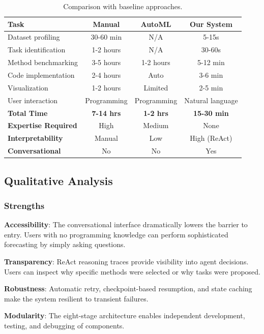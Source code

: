 \documentclass[11pt,a4paper]{article}
\begin{document}
\begin{table}[H]
\centering
\small
\begin{tabular}{lccc}
\toprule
\textbf{Task} & \textbf{Manual} & \textbf{AutoML} & \textbf{Our System} \\
\midrule
Dataset profiling & 30-60 min & N/A & 5-15s \\
Task identification & 1-2 hours & N/A & 30-60s \\
Method benchmarking & 3-5 hours & 1-2 hours & 5-12 min \\
Code implementation & 2-4 hours & Auto & 3-6 min \\
Visualization & 1-2 hours & Limited & 2-5 min \\
User interaction & Programming & Programming & Natural language \\
\midrule
\textbf{Total Time} & \textbf{7-14 hrs} & \textbf{1-2 hrs} & \textbf{15-30 min} \\
\textbf{Expertise Required} & High & Medium & None \\
\textbf{Interpretability} & Manual & Low & High (ReAct) \\
\textbf{Conversational} & No & No & Yes \\
\bottomrule
\end{tabular}
\caption{Comparison with baseline approaches.}
\end{table}

\subsection{Qualitative Analysis}

\subsubsection{Strengths}

\textbf{Accessibility}: The conversational interface dramatically lowers the barrier to entry. Users with no programming knowledge can perform sophisticated forecasting by simply asking questions.

\textbf{Transparency}: ReAct reasoning traces provide visibility into agent decisions. Users can inspect why specific methods were selected or why tasks were proposed.

\textbf{Robustness}: Automatic retry, checkpoint-based resumption, and state caching make the system resilient to transient failures.

\textbf{Modularity}: The eight-stage architecture enables independent development, testing, and debugging of components.
\end{document}
